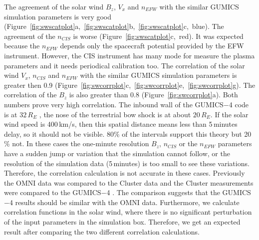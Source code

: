 \documentclass[linenumbers,draft]{agujournal}
\begin{document}
The agreement of the solar wind $B_{z}$, $V_{x}$ and $n_{EFW}$ with the similar GUMICS simulation parameters is very good (Figure~\ref{fig:swscatplot}a,~\ref{fig:swscatplot}b,~\ref{fig:swscatplot}c,~blue). The agreement of the $n_{CIS}$ is worse (Figure~\ref{fig:swscatplot}c,~red). It was expected because the $n_{EFW}$ depends only the spacecraft potential provided by the EFW instrument. However, the CIS instrument has many mode for measure the plasma parameters and it needs periodical calibration too. The correlation of the solar wind $V_{x}$,  $n_{CIS}$ and $n_{EFW}$ with the similar GUMICS simulation parameters is greater then 0.9 (Figure~\ref{fig:swcorrplot}c,~\ref{fig:swcorrplot}e,~\ref{fig:swcorrplot}g). The correlation of the $B_{z}$ is also greater than 0.8 (Figure~\ref{fig:swcorrplot}a). Both numbers prove very high correlation. The inbound wall of the GUMICS$-$4 code is at $32\,R_E$ \citep{janhunen12:_gumic_mhd}, the nose of the terrestrial bow shock is at about $20\,R_E$. If the solar wind speed is 400\,km/s, then this spatial distance means less than 5\,minutes delay, so it should not be visible. 80\% of the intervals support this theory but 20\,\% not. In these cases the one-minute resolution $B_z$, $n_{CIS}$ or the $n_{EFW}$ parameters have a sudden jump or variation that the simulation cannot follow, or the resolution of the simulation data (5\,minutes) is too small to see these variations. Therefore, the correlation calculation is not accurate in these cases. Previously the OMNI data was compared to the Cluster data and the Cluster measurements were compared to the GUMICS$-$4 \citep{facsko16:_one_earth}. The comparison suggests that the GUMICS$-$4 results should be similar with the OMNI data. Furthermore, we calculate correlation functions in the solar wind, where there is no significant perturbation of the input parameters in the simulation box. Therefore, we get an expected result after comparing the two different correlation calculations.
\end{document}
